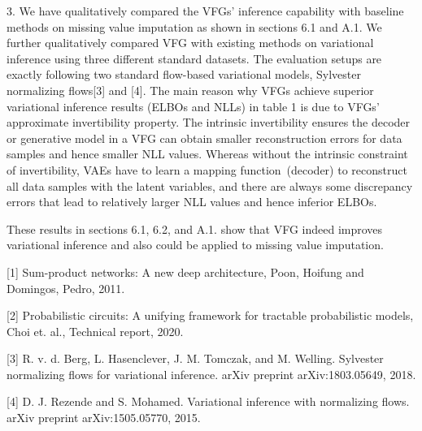 \documentclass{article}
\let\oldemptyset\emptyset
\let\emptyset\varnothing
\begin{document}
3. 
 We have qualitatively compared the VFGs' inference capability with baseline methods on missing value imputation as shown in sections 6.1 and A.1.  We further qualitatively compared VFG with existing methods on variational inference using three different standard datasets.  The evaluation setups are exactly following two standard flow-based variational models, Sylvester normalizing flows[3] and [4].  The main reason why VFGs achieve superior variational inference results (ELBOs and  NLLs) in table 1 is due to VFGs' approximate invertibility property. The intrinsic invertibility ensures the decoder or generative model in a VFG  can obtain smaller reconstruction errors for data samples and hence smaller NLL values. Whereas without the intrinsic constraint of invertibility, VAEs have to learn a mapping function~(decoder) to reconstruct all data samples with the latent variables, and there are always some discrepancy errors that lead to relatively larger NLL values and hence inferior ELBOs.
 
 These results in sections  6.1, 6.2, and A.1. show that VFG indeed improves variational inference and also could be applied to missing value imputation. 


[1] Sum-product networks: A new deep architecture, Poon, Hoifung and Domingos, Pedro, 2011.
 
 [2] Probabilistic circuits: A unifying framework for tractable probabilistic models, Choi et. al., Technical report, 2020.
 
 [3] R. v. d. Berg, L. Hasenclever, J. M. Tomczak, and M. Welling. Sylvester normalizing flows for variational inference. arXiv preprint arXiv:1803.05649, 2018.
 
 [4] D. J. Rezende and S. Mohamed. Variational inference with normalizing flows. arXiv preprint arXiv:1505.05770, 2015.


\end{document}
